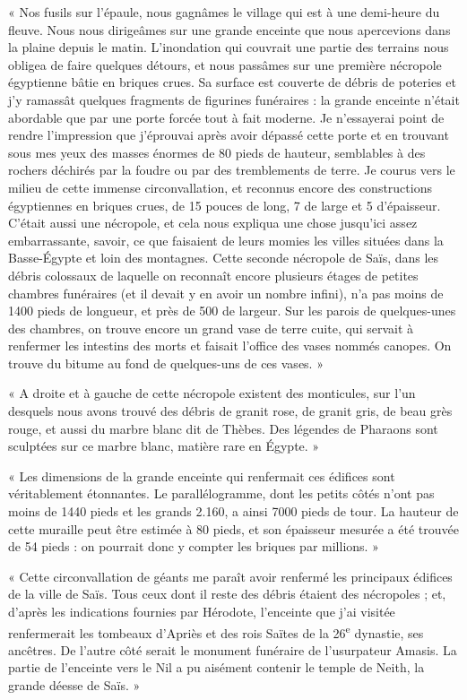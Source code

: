 \documentclass[letterpaper,twocolumn,openany,nodeprecatedcode]{dndbook}
\begin{document}
« Nos fusils sur l'épaule, nous gagnâmes le village qui est à une demi-heure du fleuve. Nous nous dirigeâmes sur une grande enceinte que nous apercevions dans la plaine depuis le matin. L'inondation qui couvrait une partie des terrains nous obligea de faire quelques détours, et nous passâmes sur une première nécropole égyptienne bâtie en briques crues. Sa surface est couverte de débris de poteries et j'y ramassât quelques fragments de figurines funéraires : la grande enceinte n'était abordable que par une porte forcée tout à fait moderne. Je n'essayerai point de rendre l'impression que j'éprouvai après avoir dépassé cette porte et en trouvant sous mes yeux des masses énormes de 80 pieds de hauteur, semblables à des rochers déchirés par la foudre ou par des tremblements de terre. Je courus vers le milieu de cette immense circonvallation, et reconnus encore des constructions égyptiennes en briques crues, de 15 pouces de long, 7 de large et 5 d'épaisseur. C'était aussi une nécropole, et cela nous expliqua une chose jusqu'ici assez embarrassante, savoir, ce que faisaient de leurs momies les villes situées dans la Basse-Égypte et loin des montagnes. Cette seconde nécropole de Saïs, dans les débris colossaux de laquelle on reconnaît encore plusieurs étages de petites chambres funéraires (et il devait y en avoir un nombre infini), n'a pas moins de 1400 pieds de longueur, et près de 500 de largeur. Sur les parois de quelques-unes des chambres, on trouve encore un grand vase de terre cuite, qui servait à renfermer les intestins des morts et faisait l'office des vases nommés canopes. On trouve du bitume au fond de quelques-uns de ces vases. »

« A droite et à gauche de cette nécropole existent des monticules, sur l'un desquels nous avons trouvé des débris de granit rose, de granit gris, de beau grès rouge, et aussi du marbre blanc dit de Thèbes. Des légendes de Pharaons sont sculptées sur ce marbre blanc, matière rare en Égypte. »

« Les dimensions de la grande enceinte qui renfermait ces édifices sont véritablement étonnantes. Le parallélogramme, dont les petits côtés n'ont pas moins de 1440 pieds et les grands 2.160, a ainsi 7000 pieds de tour. La hauteur de cette muraille peut être estimée à 80 pieds, et son épaisseur mesurée a été trouvée de 54 pieds : on pourrait donc y compter les briques par millions. »

« Cette circonvallation de géants me paraît avoir renfermé les principaux édifices de la ville de Saïs. Tous ceux dont il reste des débris étaient des nécropoles ; et, d'après les indications fournies par Hérodote, l'enceinte que j'ai visitée renfermerait les tombeaux d'Apriès et des rois Saïtes de la 26\textsuperscript{e} dynastie, ses ancêtres. De l'autre côté serait le monument funéraire de l'usurpateur Amasis. La partie de l'enceinte vers le Nil a pu aisément contenir le temple de Neith, la grande déesse de Saïs. »
\end{document}

